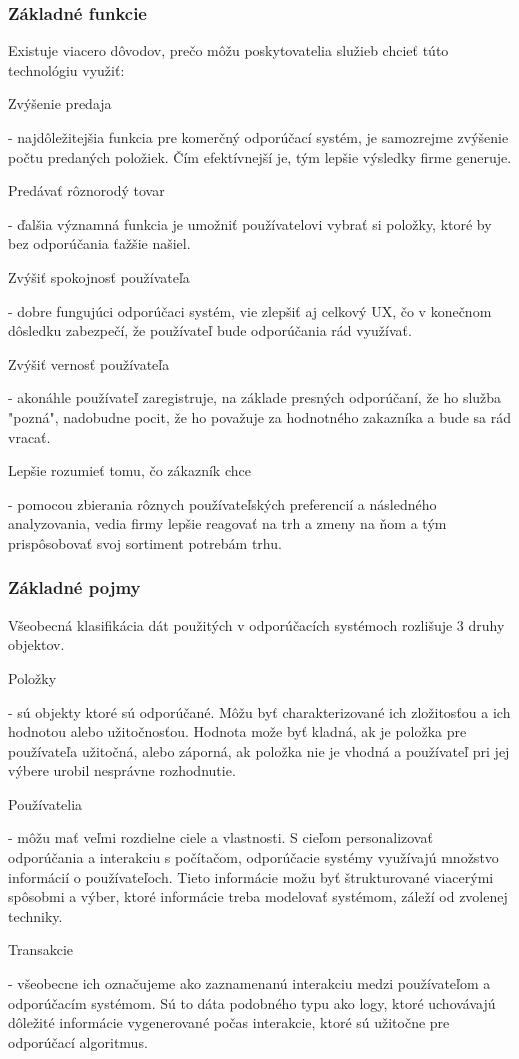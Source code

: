 \subsubsection{Základné funkcie}
Existuje viacero dôvodov, prečo môžu poskytovatelia služieb chcieť túto technológiu využiť: 
 \begin{itemize}[leftmargin=*]
{\bf \item Zvýšenie predaja} - najdôležitejšia funkcia pre komerčný odporúčací systém, je samozrejme zvýšenie počtu predaných položiek. Čím efektívnejší je, tým lepšie výsledky firme generuje.

{\bf \item Predávať rôznorodý tovar} - ďalšia významná funkcia je umožniť používatelovi vybrať si položky, ktoré by bez odporúčania ťažšie našiel.
 
{\bf \item Zvýšiť spokojnosť používateľa} - dobre fungujúci odporúčaci systém, vie zlepšiť aj celkový UX, čo v konečnom dôsledku zabezpečí, že používateľ bude odporúčania rád využívať.

{\bf \item Zvýšiť vernosť používateľa} - akonáhle používateľ zaregistruje, na základe presných odporúčaní, že ho služba "pozná", nadobudne pocit, že ho považuje za hodnotného zakazníka a bude sa rád vracať.
	
{\bf \item Lepšie rozumieť tomu, čo zákazník chce} - pomocou zbierania rôznych používateľských preferencií a následného analyzovania, vedia firmy lepšie reagovať na trh a zmeny na ňom a tým prispôsobovať svoj sortiment potrebám trhu.  \newline

\end{itemize} 


\subsubsection{Základné pojmy}
Všeobecná klasifikácia dát použitých v odporúčacích systémoch rozlišuje 3 druhy objektov.
 \begin{itemize}[leftmargin=*]
{\bf \item Položky} - sú objekty ktoré sú odporúčané. Môžu byť charakterizované ich zložitosťou a ich hodnotou alebo užitočnosťou. Hodnota može byť kladná, ak je položka pre používateľa užitočná, alebo záporná, ak položka nie je vhodná a používateľ pri jej výbere urobil nesprávne rozhodnutie.
{\bf \item Používatelia} - môžu mať veľmi rozdielne ciele a vlastnosti. S cieľom personalizovať odporúčania a interakciu s počítačom, odporúčacie systémy využívajú množstvo informácií o používateľoch. Tieto informácie možu byť štrukturované viacerými spôsobmi a výber, ktoré informácie treba modelovať systémom, záleží od zvolenej techniky. 
{\bf \item Transakcie} - všeobecne ich označujeme ako zaznamenanú interakciu medzi používateľom a odporúčacím systémom. Sú to dáta podobného typu ako logy, ktoré uchovávajú dôležité informácie vygenerované počas interakcie, ktoré sú užitočne pre odporúčací algoritmus.
\end{itemize} 


